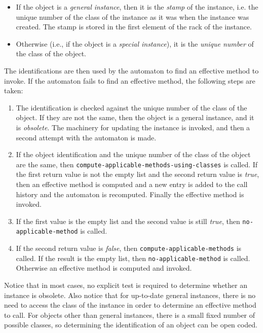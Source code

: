 \begin{itemize}
\item If the object is a \emph{general instance}, then it is the
  \emph{stamp} of the instance, i.e. the unique number of the class of
  the instance as it was when the instance was created.  The stamp is
  stored in the first element of the rack of the instance.
\item Otherwise (i.e., if the object is a \emph{special instance}), it
  is the \emph{unique number} of the class of the object.
\end{itemize}

The identifications are then used by the automaton to find an
effective method to invoke.  If the automaton fails to find an
effective method, the following steps are taken:

\begin{enumerate}
\item The identification is checked against the unique
  number of the class of the object.  If they are not the same, then
  the object is a general instance, and it is \emph{obsolete}.  The
  machinery for updating the instance is invoked, and then a second
  attempt with the automaton is made. 
\item If the object identification and the unique number of the
  class of the object are the same, then
  \texttt{compute-applicable-methods-using-classes} is called.  If the
  first return value is not the empty list and the second return value
  is \textit{true}, then an effective method is computed and a new
  entry is added to the call history and the automaton is recomputed.
  Finally the effective method is invoked.
\item If the first value is the empty list and the second value is
  still \textit{true}, then \texttt{no-applicable-method} is called.
\item If the second return value is \textit{false}, then 
 \texttt{compute-applicable-methods} is called.  If the result is the
 empty list, then \texttt{no-applicable-method} is called.  Otherwise
 an effective method is computed and invoked. 
\end{enumerate}

Notice that in most cases, no explicit test is required to determine
whether an instance is obsolete.  Also notice that for up-to-date
general instances, there is no need to access the class of the
instance in order to determine an effective method to call.  For
objects other than general instances, there is a small fixed number of
possible classes, so determining the identification of an object can
be open coded.

